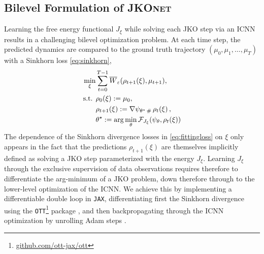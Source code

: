 \subsection{Bilevel Formulation of \textsc{JKOnet}}
Learning the free energy functional $J_\xi$ while solving each JKO step via an ICNN results in a challenging bilevel optimization problem.
At each time step, the predicted dynamics are compared to the ground truth trajectory $(\mu_0, \mu_1, \dots, \mu_T)$ with a Sinkhorn loss \eqref{eq:sinkhorn},
\begin{align}\label{eq:fittingloss}
\begin{split}
    \min_\xi & \sum_{t=0}^{T-1} \overline{W}_{\varepsilon}(\rho_{t+1}(\xi), \mu_{t+1}), \\
    \text{s.t. } & \rho_{0}(\xi) := \mu_0, \\
      & \rho_{t+1}(\xi) := \nabla \psi_{\theta^\star\, \#}\, \rho_{t}(\xi)\,, \\
      & \theta^\star:=\arg \min_{\theta} \mathcal{F}_{J_{\xi}}(\psi_{\theta},\rho_t(\xi))
\end{split}
\end{align}
The dependence of the Sinkhorn divergence losses in \eqref{eq:fittingloss} on $\xi$ only appears in the fact that the predictions $\rho_{t+1}(\xi)$ are themselves implicitly defined as solving a JKO step parameterized with the energy $J_\xi$. 
Learning  $J_\xi$ through the exclusive supervision of data observations requires therefore to differentiate the arg-minimum of a JKO problem, down therefore through to the lower-level optimization of the ICNN. We achieve this by implementing a differentiable double loop in \texttt{JAX}, differentiating first the Sinkhorn divergence using the \texttt{OTT}\footnote{\href{https://github.com/ott-jax/ott}{github.com/ott-jax/ott}} package \citep{cuturi2022optimal}, and then backpropagating through the ICNN optimization by unrolling Adam steps \citep{kingma2014adam, metz2016unrolled, lorraine2020}.


